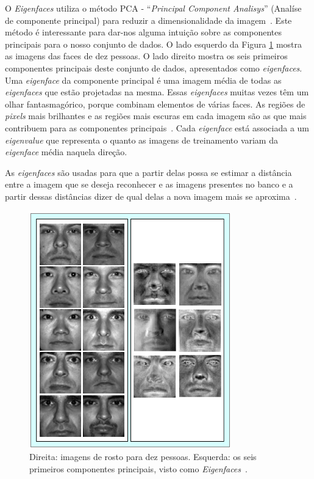 	O \textit{Eigenfaces} utiliza o método PCA - ``\textit{Principal Component
	Analisys}'' (Analíse de componente principal) para reduzir a dimensionalidade da
	imagem~\cite{hewitt}. Este método é interessante para dar-nos alguma intuição
	sobre as componentes principais para o nosso conjunto de dados. O lado esquerdo
	da Figura \ref{exemploEigenfaces} mostra as imagens das faces de dez pessoas. O
	lado direito  mostra os seis primeiros componentes principais deste conjunto de
	dados, apresentados como \textit{eigenfaces}. Uma \textit{eigenface} da
	componente principal é uma imagem média de todas as \textit{eigenfaces} que
	estão projetadas na mesma. Essas \textit{eigenfaces} muitas vezes têm um olhar
	fantasmagórico, porque combinam elementos de várias faces. As regiões de
	\textit{pixels} mais brilhantes e as regiões mais escuras em cada imagem são as
	que mais contribuem para as componentes principais~\cite{hewitt}. Cada \textit{eigenface}
	está associada a um \textit{eigenvalue} que representa o quanto as imagens de treinamento
	variam da \textit{eigenface} média naquela direção.
	
	As \textit{eigenfaces} são usadas para que a
	partir delas possa se estimar a distância entre a imagem que se deseja
	reconhecer e as imagens presentes no banco e a partir dessas distâncias dizer de
	qual delas a nova imagem mais se aproxima~\cite{turkpentland}.

	\begin{figure}[H]
		\begin{center}
			\includegraphics[scale=1.2]{figuras/2.FundamentacaoTeorica/eigenfaces.png}
		\end{center}
		\caption{Direita: imagens de rosto para dez pessoas. Esquerda: os seis primeiros componentes principais, visto como \textit{Eigenfaces}~\cite{hewitt}.}
		\label{exemploEigenfaces}
	\end{figure}

